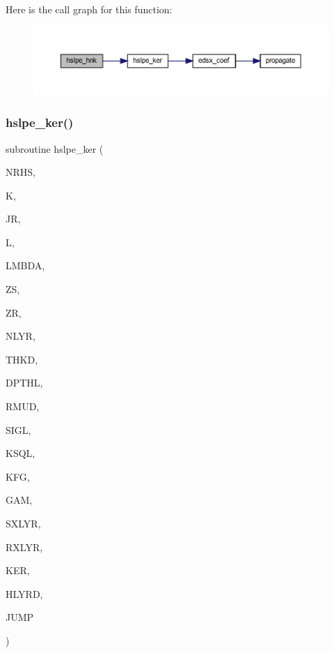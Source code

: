 Here is the call graph for this function\+:\nopagebreak
\begin{figure}[H]
\begin{center}
\leavevmode
\includegraphics[width=350pt]{Leroi__c_8f90_adae61b12e3735bac162cd8f39a3607d3_cgraph}
\end{center}
\end{figure}
\mbox{\label{Leroi__c_8f90_ae58b6750741316da9a6a86b44785fa58}} 
\subsubsection{\texorpdfstring{hslpe\+\_\+ker()}{hslpe\_ker()}}
{\footnotesize\ttfamily subroutine hslpe\+\_\+ker (\begin{DoxyParamCaption}\item[{integer}]{N\+R\+HS,  }\item[{integer}]{K,  }\item[{integer}]{JR,  }\item[{integer}]{L,  }\item[{real(kind=ql)}]{L\+M\+B\+DA,  }\item[{real(kind=ql)}]{ZS,  }\item[{real(kind=ql)}]{ZR,  }\item[{integer}]{N\+L\+YR,  }\item[{real(kind=ql), dimension (nlyr)}]{T\+H\+KD,  }\item[{real(kind=ql), dimension (nlyr)}]{D\+P\+T\+HL,  }\item[{real(kind=ql), dimension(0\+:nlyr)}]{R\+M\+UD,  }\item[{complex(kind=ql), dimension (nlyr)}]{S\+I\+GL,  }\item[{complex(kind=ql), dimension (nlyr)}]{K\+S\+QL,  }\item[{integer}]{K\+FG,  }\item[{integer}]{G\+AM,  }\item[{integer}]{S\+X\+L\+YR,  }\item[{integer}]{R\+X\+L\+YR,  }\item[{complex(kind=ql), dimension(jnlo-\/nrhs\+:jnhi,3)}]{K\+ER,  }\item[{complex(kind=ql), dimension(nrhs,3)}]{H\+L\+Y\+RD,  }\item[{logical}]{J\+U\+MP }\end{DoxyParamCaption})}

